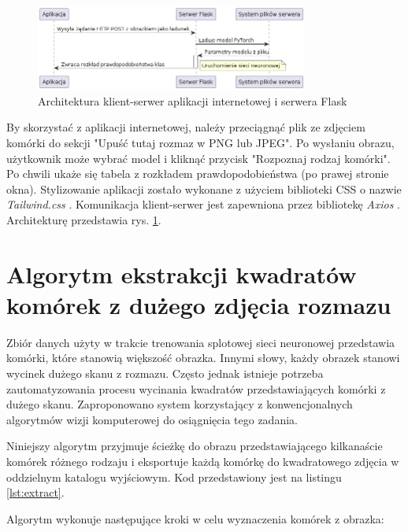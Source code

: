 \begin{figure}
    \centering
    \includegraphics[width=0.8\textwidth]{arch}
    \caption{Architektura klient-serwer aplikacji internetowej i serwera Flask}
    \label{fig:arch}
\end{figure}

By skorzystać z aplikacji internetowej, należy przeciągnąć plik ze zdjęciem komórki do sekcji "Upuść tutaj rozmaz w PNG lub JPEG".
Po wysłaniu obrazu, użytkownik może wybrać model i kliknąć przycisk "Rozpoznaj rodzaj komórki".
Po chwili ukaże się tabela z rozkładem prawdopodobieństwa (po prawej stronie okna).
Stylizowanie aplikacji zostało wykonane z użyciem biblioteki CSS o nazwie \textit{Tailwind.css} \cite{tailwind}.
Komunikacja klient-serwer jest zapewniona przez bibliotekę \textit{Axios} \cite{axios}.
Architekturę przedstawia rys. \ref{fig:arch}.


\section{Algorytm ekstrakcji kwadratów komórek z dużego zdjęcia rozmazu}\label{sec:kwadraty}

Zbiór danych użyty w trakcie trenowania splotowej sieci neuronowej przedstawia komórki, które stanowią większość obrazka.
Innymi słowy, każdy obrazek stanowi wycinek dużego skanu z rozmazu.
Często jednak istnieje potrzeba zautomatyzowania procesu wycinania kwadratów przedstawiających komórki z dużego skanu.
Zaproponowano system korzystający z konwencjonalnych algorytmów wizji komputerowej do osiągnięcia tego zadania.

Niniejszy algorytm przyjmuje ścieżkę do obrazu przedstawiającego kilkanaście komórek różnego rodzaju i eksportuje
każdą komórkę do kwadratowego zdjęcia w oddzielnym katalogu wyjściowym.
Kod przedstawiony jest na listingu \ref{lst:extract}.



Algorytm wykonuje następujące kroki w celu wyznaczenia komórek z obrazka:

